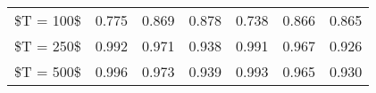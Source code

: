 % 
\begin{tabular}{ccccccc}
  \hline
  \hline
\$T = 100\$ & 0.775 & 0.869 & 0.878 & 0.738 & 0.866 & 0.865 \\ 
  \$T = 250\$ & 0.992 & 0.971 & 0.938 & 0.991 & 0.967 & 0.926 \\ 
  \$T = 500\$ & 0.996 & 0.973 & 0.939 & 0.993 & 0.965 & 0.930 \\ 
   \hline
\end{tabular}
